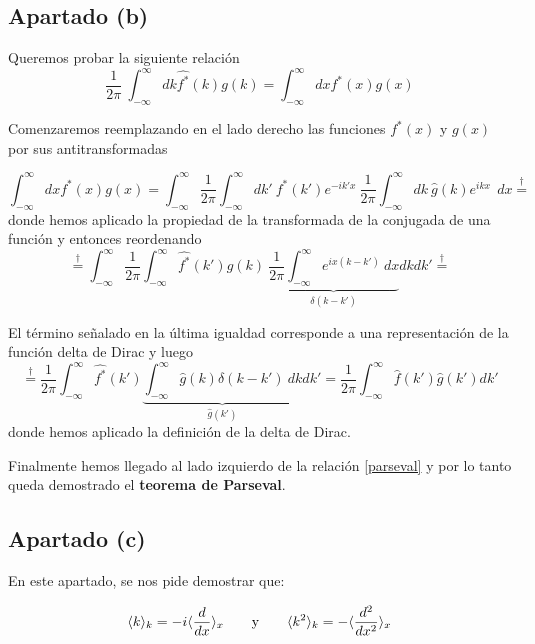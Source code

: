 \subsection{\textbf{Apartado (b)}}
Queremos probar la siguiente relación
\begin{equation}
    \frac{1}{2\pi}~ \int_{-\infty}^{\infty} dk \hat{f^*}(k) g(k) = \int_{-\infty}^{\infty} dx f^*(x) g(x)
    \label{parseval}
\end{equation}

Comenzaremos reemplazando en el lado derecho las funciones $f^*(x)$ y $g(x)$ por sus antitransformadas

\begin{equation}
\int_{-\infty}^{\infty} dx f^*(x) g(x) = \int_{-\infty}^{\infty} \frac{1}{2\pi} \int_{-\infty}^{\infty} dk'~\hat{f^*}(k') e^{-ik'x} ~\frac{1}{2\pi} \int_{-\infty}^{\infty} dk~\hat{g}(k) e^{ikx} ~~dx \overset{\dagger}{=}
\end{equation}
donde hemos aplicado la propiedad de la transformada de la conjugada de una función y entonces reordenando 
\begin{equation}
\overset{\dagger}{=} \int_{-\infty}^{\infty}  \frac{1}{2\pi} \int_{-\infty}^{\infty} \hat{f^*}(k') \hat{g}(k) ~\underbrace{\frac{1}{2\pi}  \int_{-\infty}^{\infty} e^{ix(k-k')}~ dx}_{\delta(k-k')} dk dk' \overset{\dagger}{=}
\end{equation}

El término señalado en la última igualdad corresponde a una representación de la función delta de Dirac\cite[][Sec. 15.2]{arfken} y luego
\begin{equation}
\overset{\dagger}{=}\frac{1}{2\pi} \int_{-\infty}^{\infty} \hat{f^*}(k') \underbrace{\int_{-\infty}^{\infty} \hat{g}(k) \delta(k-k')~ dk}_{\hat{g}(k')} dk' = \frac{1}{2\pi} \int_{-\infty}^{\infty} \hat{f}(k') \hat{g}(k') dk'
\end{equation}
donde hemos aplicado la definición de la delta de Dirac.

Finalmente hemos llegado al lado izquierdo de la relación \ref{parseval} y por lo tanto queda demostrado el \textbf{teorema de Parseval}.



\subsection{\textbf{Apartado (c)}}

En este apartado, se nos pide demostrar que:

\begin{equation}\label{enun.c}
    \langle k \rangle_k=-i\langle\frac{d}{dx}\rangle
    _x\hspace{0.7cm} \text{y} \hspace{0.7cm} \langle k^2 \rangle_k=-\langle \frac{d^2}{dx^2}\rangle_x
\end{equation}

